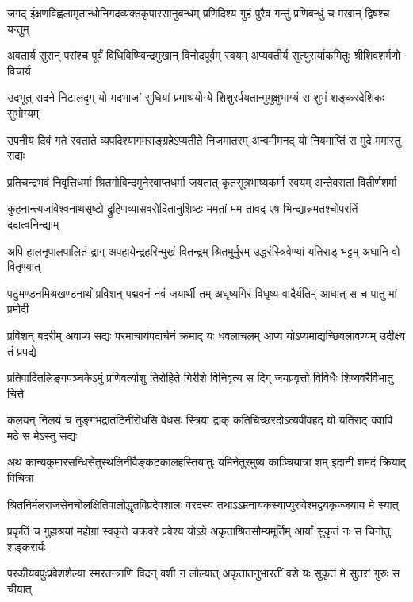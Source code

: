 \twolineshloka
{जगद् ईक्षणविह्वलामृतान्धोनिगदव्यक्तकृपारसानुबन्धम्}
{प्रणिदिश्य गुहं पुरैव गन्तुं प्रणिबन्धुं च मखान् द्विषश्च यन्तुम्}%

\twolineshloka
{अवतार्य सुरान् परांश्च पूर्वं विधिविष्ण्विन्द्रमुखान् विनोदपूर्वम्}
{स्वयम् अप्यवतीर्य सुत्युरार्याकमितुः श्रीशिवशर्मणो विचार्य}%

\twolineshloka
{उदभूत् सदने निटालदृग् यो मदभाजां सुधियां प्रमाथयोग्ये}
{शिशुरर्पयतान्मुमुक्षुभाग्यं स शुभं शङ्करदेशिकः सुभोग्यम्}%

\twolineshloka
{उपनीय दिवं गते स्वताते व्यपदिश्यागमसङ्ग्रहेऽप्यतीते}
{निजमातरम् अन्वमीमनद् यो नियमाप्तिं स मुदे ममास्तु सद्यः}%

\twolineshloka
{प्रतिचन्द्रभवं निवृत्तिधर्मा श्रितगोविन्दमुनेरवाप्तधर्मा}
{जयतात् कृतसूत्रभाष्यकर्मा स्वयम् अन्तेवसतां वितीर्णशर्मा}%

\twolineshloka
{कुहनान्त्यजविश्वनाथसृष्टो द्रुहिणव्यासवरोदितानुशिष्टः}
{ममतां मम तावद् एष भिन्द्यान्नमतश्चोपरतिं ददात्वनिन्द्याम्}%

\twolineshloka
{अपि हालनृपालपालितं द्राग् अपहायेन्द्रहरिन्मुखं वितन्द्रम्}
{श्रितमुर्मुरम् उद्धरंस्त्रिवेण्यां यतिराड् भट्टम् अघानि वो वितृण्यात्}%

\twolineshloka
{पटुमण्डनमिश्रखण्डनार्थं प्रविशन् पद्मवनं नवं जयार्थी}
{तम् अधृष्यगिरं विधृष्य वादैर्यतिम् आधात् स च पातु मां प्रमोदी}%

\twolineshloka
{प्रविशन् बदरीम् अवाप्य सद्यः परमाचार्यपदार्चनं क्रमाद् यः}
{धवलाचलम् आप्य योऽप्यमाद्यच्छिवलावण्यम् उदीक्ष्य तं प्रपद्ये}%

\twolineshloka
{प्रतिपादितलिङ्गपञ्चकेऽमुं प्रणिवर्त्याशु तिरोहिते गिरीशे}
{विनिवृत्य स दिग् जयप्रवृत्तो विविधैः शिष्यवरैर्विभातु चित्ते}%

\twolineshloka
{कलयन् निलयं च तुङ्गभद्रातटिनीरोधसि वेधसः स्त्रिया द्राक्}
{कतिचिच्छरदोऽत्यवीवहद् यो यतिराट् क्वापि मठे स मेऽस्तु सद्यः}%

\twolineshloka
{अथ कान्यकुमारसन्धिसेतुस्थलिनीवैङ्कटकालहस्तियातुः}
{यमिनेतुरमुष्य काञ्चियात्रा शम् इदानीं शमदं क्रियाद् विचित्रा}%

\twolineshloka
{श्रितनिर्मलराजसेनचोलक्षितिपालोद्धृतविप्रदेवशालः}
{वरदस्य तथाऽऽम्रनायकस्याप्युरुवेश्मद्वयकृज्जयाय मे स्यात्}%

\twolineshloka
{प्रकृतिं च गुहाश्रयां महोग्रां स्वकृते चक्रवरे प्रवेश्य योऽग्रे}
{अकृताश्रितसौम्यमूर्तिम् आर्यां सुकृतं नः स चिनोतु शङ्करार्यः}%

\twolineshloka
{परकीयवपुःप्रवेशशैल्या स्मरतन्त्राणि विदन् वशी न लौल्यात्}
{अकृतातनुभारतीं वशे यः सुकृतं मे सुतरां गुरुः स चीयात्}%

